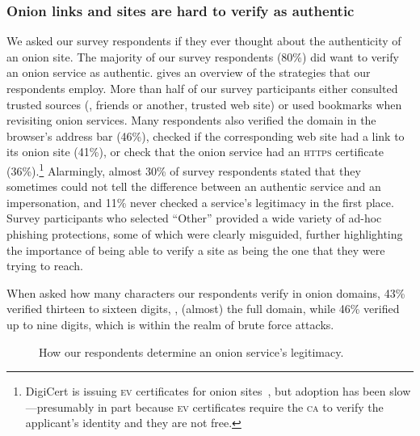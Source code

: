 \subsubsection{Onion links and sites are hard to verify as authentic}
We asked our survey respondents if they ever thought about the authenticity of an onion
site.  The majority of our survey respondents (80\%) did want to verify an onion service as authentic.   gives an overview of the
strategies that our respondents employ.  More than half of our survey participants either consulted trusted
sources (\eg, friends or another, trusted web site) or used bookmarks when
revisiting onion services.  Many respondents also verified the domain in the
browser's address bar (46\%), checked if the corresponding web site had a link to
its onion site (41\%), or check that the onion service had an \textsc{https}
certificate (36\%).\footnote{DigiCert is issuing \textsc{ev} certificates for
onion sites~\cite{DigiCert2015a}, but adoption has been slow---presumably in part
because \textsc{ev} certificates require the \textsc{ca} to verify the
applicant's identity and they are not free.}  Alarmingly, almost 30\% of
survey respondents stated that they sometimes could not tell the difference between an
authentic service and an impersonation, and 11\% never checked a service's
legitimacy in the first place.  Survey participants who selected ``Other'' provided a wide
variety of ad-hoc phishing protections, some of which were clearly misguided, 
further highlighting the importance of being able to verify a site as being the one that they were trying to reach.

When asked how many characters our respondents verify in
onion domains,  43\% verified thirteen to sixteen digits, \ie, (almost) the full
domain, while 46\% verified up to nine digits, which is within the realm of brute
force attacks.

\begin{figure}[t]
    \centering
    
    \caption{How our respondents determine an onion service's legitimacy.}
    \label{fig:determining-legitimacy}
\end{figure}


